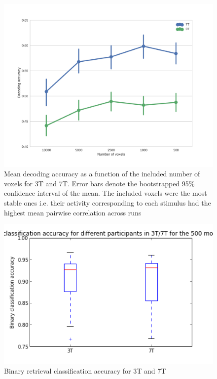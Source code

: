 \begin{figure}
	\centering
	\includegraphics[width=\linewidth]{pics/nr_of_voxels_both}
	\caption{Mean decoding accuracy as a function of the included number of voxels for 3T and 7T. Error bars denote the bootstrapped 95\% confidence interval of the mean. The included voxels were the most stable ones i.e. their activity corresponding to each stimulus had the highest mean pairwise correlation across runs}
	\label{fig:voxelnr}
\end{figure}
 
 
 
\begin{figure}
	\centering
	\includegraphics[width=\linewidth]{pics/binary_retrieval_accuracy}
	\caption{Binary retrieval classification accuracy for 3T and 7T}
	\label{fig:binretr}
\end{figure}
 
